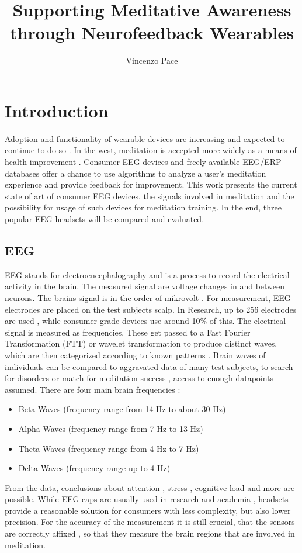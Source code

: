 \documentclass{llncs} %
\begin{document}
\title{Supporting Meditative Awareness through Neurofeedback Wearables}
\author{Vincenzo Pace}
\maketitle
\newpage
\section{Introduction}
Adoption and functionality of wearable devices are increasing and expected to continue to do so \cite{Patel}. In the west, meditation is accepted more widely as a means of health improvement \cite{Tang:et al}.
Consumer EEG devices and freely available EEG/ERP databases \cite{ucsd} offer a chance to use algorithms to analyze a user's meditation experience and provide feedback for improvement.
This work presents the current state of art of consumer EEG devices, the signals involved in meditation and the possibility for usage of such devices for meditation training.
In the end, three popular EEG headsets will be compared and evaluated.
\subsection{EEG}
EEG stands for electroencephalography and is a process to record the electrical activity in the brain. The measured signal are voltage changes in and between neurons.
The brains signal is in the order of mikrovolt \cite{Berger}.  For measurement, EEG electrodes are placed on the test subjects scalp. In Research, up to 256 electrodes are used \cite{Seeck}, while consumer grade devices use around 10\% of this. \cite{Maskeliunas}
The electrical signal is measured as frequencies. These get passed to a Fast Fourier Transformation (FTT) or wavelet transformation \cite{Akin} to produce distinct waves, which are then categorized according to known patterns \cite{Shaker}.
Brain waves of individuals can be compared to aggravated data of many test subjects, to search for disorders \cite{Loo} or match for meditation success \cite{Tang:et al}, access to enough datapoints assumed.
There are four main brain frequencies \cite{Cahn}:
\begin{itemize}
    \item 
    Beta Waves (frequency range from 14 Hz to about 30 Hz)
    \item 
    Alpha Waves (frequency range from 7 Hz to 13 Hz)
    \item 
    Theta Waves (frequency range from 4 Hz to 7 Hz)
    \item 
    Delta Waves (frequency range up to 4 Hz)
\end{itemize}
From the data, conclusions about attention \cite{Berka}, stress \cite{Hosseini}, cognitive load \cite{Antonenko} and more are possible.
While EEG caps are usually used in research and academia \cite{Seeck}, headsets provide a reasonable solution for consumers with less complexity, but also lower precision\cite{Maskeliunas}.
For the accuracy of the measurement it is still crucial, that the sensors are correctly affixed \cite{Seeck}, so that they measure the brain regions that are involved in meditation.
\end{document}

